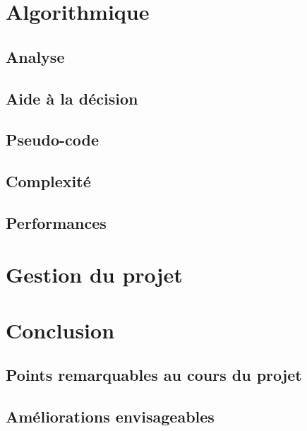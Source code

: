 \documentclass[a4paper,11pt]{article}
\begin{document}
\section{Algorithmique}
  \subsection{Analyse} 
  \subsection{Aide à la décision} 
  \subsection{Pseudo-code}
  \subsection{Complexité}
  \subsection{Performances}
\section{Gestion du projet}
  
\section{Conclusion}
  \subsection{Points remarquables au cours du projet}  
  \subsection{Améliorations envisageables} 

\end{document}

